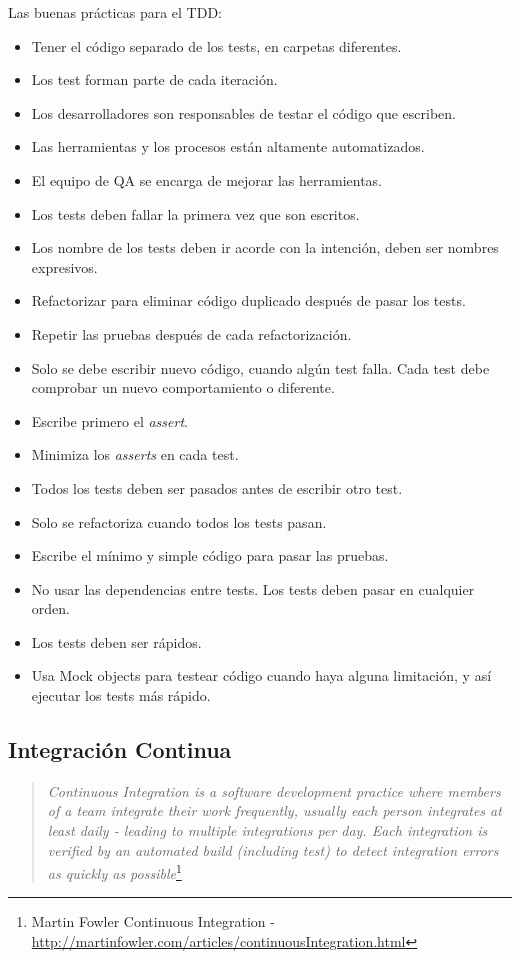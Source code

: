 \par Las buenas prácticas para el TDD:
\begin{itemize}
	\item Tener el código separado de los tests, en carpetas diferentes.
	\item Los test forman parte de cada iteración.
	\item Los desarrolladores son responsables de testar el código que escriben.
	\item Las herramientas y los procesos están altamente automatizados.
	\item El equipo de QA se encarga de mejorar las herramientas.
	\item Los tests deben fallar la primera vez que son escritos.
	\item Los nombre de los tests deben ir acorde con la intención, deben ser nombres expresivos.
	\item Refactorizar para eliminar código duplicado después de pasar los tests.
	\item Repetir las pruebas después de cada refactorización.
	\item Solo se debe escribir nuevo código, cuando algún test falla. Cada test debe comprobar un nuevo comportamiento o diferente.
	\item Escribe primero el \emph{assert}.
	\item Minimiza los \emph{asserts} en cada test.
	\item Todos los tests deben ser pasados antes de escribir otro test.
	\item Solo se refactoriza cuando todos los tests pasan.
	\item Escribe el mínimo y simple código para pasar las pruebas.
	\item No usar las dependencias entre tests. Los tests deben pasar en cualquier orden.
	\item Los tests deben ser rápidos.
	\item Usa Mock objects para testear código cuando haya alguna limitación, y así ejecutar los tests más rápido.
\end{itemize}


\subsection{Integración Continua}
\label{sub:integracion-continua}

\begin{quote}
    \emph{Continuous Integration is a software development practice where members of a team integrate their work frequently, usually each person integrates at least daily - leading to multiple integrations per day. Each integration is verified by an automated build (including test) to detect integration errors as quickly as possible}\footnote{Martin Fowler Continuous Integration - \url{http://martinfowler.com/articles/continuousIntegration.html}}
\end{quote}

